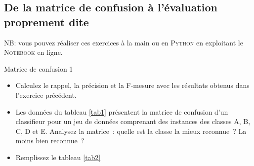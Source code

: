 \noindent{}

\subsection{De la matrice de confusion à l'évaluation proprement dite}

NB: vous pouvez réaliser ces exercices à la main ou en \textsc{Python} en exploitant le \textsc{Notebook} en ligne.
\begin{table}[h]
  
  \caption{\label{tab1} Matrice de confusion 1}
\end{table}
\begin{itemize}
  \item Calculez le rappel, la précision et la F-mesure avec les résultats obtenus dans l’exercice précédent.
\item Les données du tableau \ref{tab1} présentent la matrice de confusion d’un classifieur pour un jeu de données comprenant des instances des classes A, B, C, D et E. Analysez la matrice : quelle est la classe la mieux reconnue ? La moins bien reconnue ?
\item Remplissez le tableau \ref{tab2}
\end{itemize}

